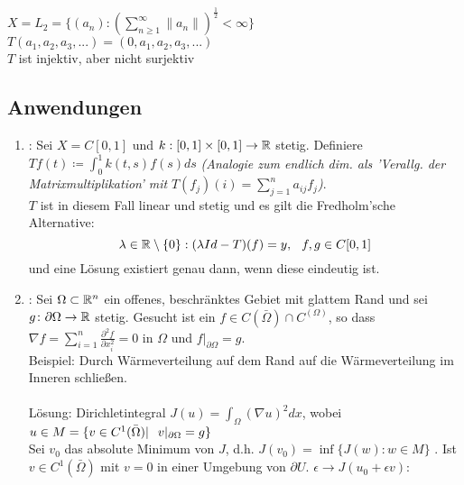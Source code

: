 \begin{beispiel}
$X = L_{2} = \{ (a_{n}): \left( \sum_{n \geq 1}^{\infty} \| a_{n} \| \right)^{\frac{1}{2}} < \infty \}$	\\
$T ( a_{1}, a_{2}, a_{3}, ...) = ( 0, a_{1}, a_{2}, a_{3}, ...)$ \\

$T$ ist injektiv, aber nicht surjektiv
\end{beispiel}

\newpage %

\subsection*{Anwendungen}


\begin{enumerate}
	\item {}:  Sei $X = C[0, 1]$ und $k: [0, 1] \times [0, 1] \rightarrow \mathbb{R}$ stetig. Definiere $Tf(t) \coloneqq \int_{0}^{1} k(t, s) f(s) ds$ \textit{(Analogie zum endlich dim. als 'Verallg. der Matrixmultiplikation' mit} $T(f_{j})(i) = \sum_{j = 1}^{n} a_{ij}f_{j}$\textit{)}. \\
 	$T$ ist in diesem Fall linear und stetig und es gilt die Fredholm'sche Alternative:
	\[ \lambda \in \mathbb{R} \setminus \{0\}: (\lambda Id - T)(f) = y, \hspace{0.25cm} f,g \in C[0, 1] \]
	und eine Lösung existiert genau dann, wenn diese eindeutig ist. \\
	\item {}:  Sei $\Omega \subset \mathbb{R}^n$ ein offenes, beschränktes Gebiet mit glattem Rand und sei $g \colon \partial \Omega \rightarrow \mathbb{R}$ stetig. Gesucht ist ein $f \in C(\bar \Omega) \cap  C^(\Omega)$, so dass $\nabla f = \sum_{i = 1}^{n} \frac{\partial^{2} f}{\partial x_{i}^2} = 0$ in $\Omega$ und $f|_{\partial \Omega}= g$. \\
	Beispiel: Durch Wärmeverteilung auf dem Rand auf die Wärmeverteilung im Inneren schlie{\ss}en. \\ \\
	Lösung: Dirichletintegral $J(u) = \int_{\Omega} (\nabla u )^{2} dx$, wobei $ u \in M = \{ v \in C^{1}(\bar \Omega) | \hspace{0.25cm} v|_{\partial \Omega} = g \}$ \\
	Sei $v_{0}$ das absolute Minimum von $J$, d.h. $J(v_{0}) = \inf \{ J(w): w \in M \}$ . Ist $v \in C^{1}(\bar \Omega)$ mit $v = 0$ in einer Umgebung von $\partial U$. $\epsilon \rightarrow J(u_{0} + \epsilon v)$:

\end{enumerate}
